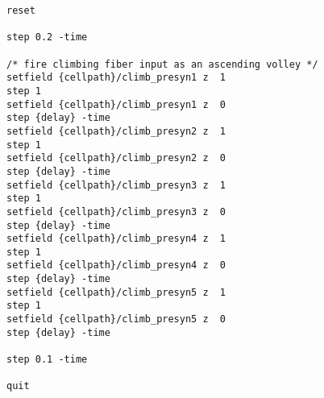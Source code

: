 \documentclass[10pt]{article}
\begin{document}
\begin{verbatim}
reset

step 0.2 -time

/* fire climbing fiber input as an ascending volley */
setfield {cellpath}/climb_presyn1 z  1
step 1
setfield {cellpath}/climb_presyn1 z  0
step {delay} -time
setfield {cellpath}/climb_presyn2 z  1
step 1
setfield {cellpath}/climb_presyn2 z  0
step {delay} -time
setfield {cellpath}/climb_presyn3 z  1
step 1
setfield {cellpath}/climb_presyn3 z  0
step {delay} -time
setfield {cellpath}/climb_presyn4 z  1
step 1
setfield {cellpath}/climb_presyn4 z  0
step {delay} -time
setfield {cellpath}/climb_presyn5 z  1
step 1
setfield {cellpath}/climb_presyn5 z  0
step {delay} -time

step 0.1 -time

quit

\end{verbatim}
\end{document}
